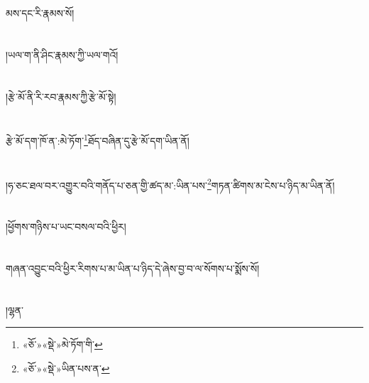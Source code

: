 མས་དང་རི་རྣམས་སོ།\chapter{ }།ཡལ་ག་ནི་ཤིང་རྣམས་ཀྱི་ཡལ་གའོ།\chapter{ }།རྩེ་མོ་ནི་རི་རབ་རྣམས་ཀྱི་རྩེ་མོ་སྟེ།\chapter{ }རྩེ་མོ་དག་ཁོ་ན་:མེ་ཏོག་\footnote{«ཅོ་»«སྡེ་»མེ་ཏོག་གི་}ཐོད་བཞིན་དུ་རྩེ་མོ་དག་ཡིན་ནོ།\chapter{ }།ཧ་ཅང་ཐལ་བར་འགྱུར་བའི་གནོད་པ་ཅན་གྱི་ཚད་མ་:ཡིན་པས་\footnote{«ཅོ་»«སྡེ་»ཡིན་པས་ན་}གཏན་ཚིགས་མ་ངེས་པ་ཉིད་མ་ཡིན་ནོ།\chapter{ }།ཕྱོགས་གཉིས་པ་ཡང་བསལ་བའི་ཕྱིར།\chapter{ }གཞན་འབྱུང་བའི་ཕྱིར་རིགས་པ་མ་ཡིན་པ་ཉིད་དེ་ཞེས་བྱ་བ་ལ་སོགས་པ་སྨོས་སོ།\chapter{ }།ལྷན་